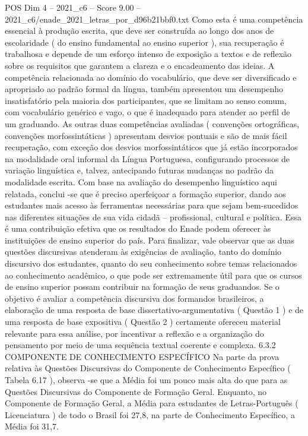 \begin{textsample}{POS Dim 4 – 2021\_c6 – Score 9.00 – 2021\_c6/enade\_2021\_letras\_por\_d96b21bbf0.txt}
Como esta é uma competência essencial à produção escrita, que deve ser construída ao longo dos anos de escolaridade ( do ensino fundamental ao ensino superior ), sua recuperação é trabalhosa e depende de um esforço intenso de exposição a textos e de reflexão sobre os requisitos que garantem a clareza e o encadeamento das ideias.
A competência relacionada ao domínio do vocabulário, que deve ser diversificado e apropriado ao padrão formal da língua, também apresentou um desempenho insatisfatório pela maioria dos participantes, que se limitam ao senso comum, com vocabulário genérico e vago, o que é inadequado para atender ao perfil de um graduando.
As outras duas competências avaliadas ( convenções ortográficas, convenções morfossintáticas ) apresentam desvios pontuais e são de mais fácil recuperação, com exceção dos desvios morfossintáticos que já estão incorporados na modalidade oral informal da Língua Portuguesa, configurando processos de variação linguística e, talvez, antecipando futuras mudanças no padrão da modalidade escrita.
Com base na avaliação do desempenho linguístico aqui relatada, conclui -se que é preciso aperfeiçoar a formação superior, dando aos estudantes mais acesso às ferramentas necessárias para que sejam bem-sucedidos nas diferentes situações de sua vida cidadã – profissional, cultural e política.
Essa é uma contribuição efetiva que os resultados do Enade podem oferecer às instituições de ensino superior do país.
Para finalizar, vale observar que as duas questões discursivas atenderam às exigências de avaliação, tanto do domínio discursivo dos estudantes, quanto do seu conhecimento sobre temas relacionados ao conhecimento acadêmico, o que pode ser extremamente útil para que os cursos de ensino superior possam contribuir na formação de seus graduandos.
Se o objetivo é avaliar a competência discursiva dos formandos brasileiros, a elaboração de uma resposta de base dissertativo-argumentativa ( Questão 1 ) e de uma resposta de base expositiva ( Questão 2 ) certamente ofereceu material relevante para essa análise, por incentivar a reflexão e a organização do pensamento por meio de uma sequência textual coerente e complexa. 6.3.2 COMPONENTE DE CONHECIMENTO ESPECÍFICO Na parte da prova relativa às Questões Discursivas do Componente de Conhecimento Específico ( Tabela 6.17 ), observa -se que a Média foi um pouco mais alta do que para as Questões Discursivas do Componente de Formação Geral.
Enquanto, no Componente de Formação Geral, a Média para estudantes de Letras-Português ( Licenciatura ) de todo o Brasil foi 27,8, na parte de Conhecimento Específico, a Média foi 31,7.

\end{textsample}
